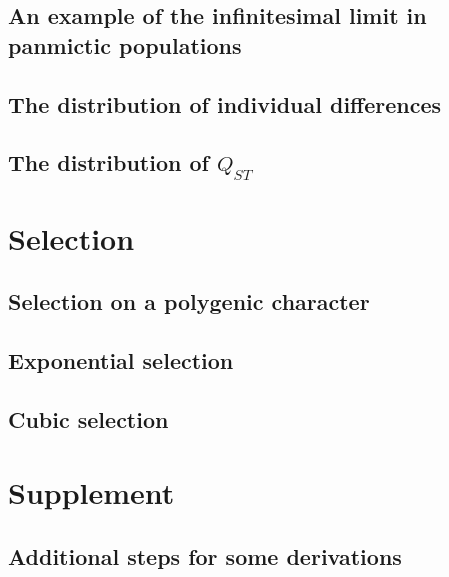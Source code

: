 \documentclass{article}
\begin{document}
\subsection{An example of the infinitesimal limit in panmictic populations}

\subsection{The distribution of individual differences}

\subsection{The distribution of $Q_{ST}$}

\section{Selection}
\subsection{Selection on a polygenic character}

\subsection{Exponential selection}

\subsection{Cubic selection}


\clearpage



\section{Supplement}
\subsection{Additional steps for some derivations}

\end{document}
